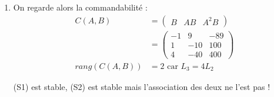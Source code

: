 \documentclass[../main.tex]{subfiles}
\begin{document}
\begin{enumerate}
\begin{enumerate}
\item On regarde alors la commandabilité :
\begin{align*}
C(A,B) &= \begin{pmatrix} B & AB & A^2B \end{pmatrix}\\
&= \begin{pmatrix}
-1 & 9 & -89 \\
1 & -10 & 100\\
4 & -40 & 400
\end{pmatrix}\\
rang(C(A,B)) &= 2 \text{	car	} L_3 = 4L_2
\end{align*}

(S1) est stable, (S2) est stable mais l'association des deux ne l'est pas !\\


\end{enumerate}
\end{enumerate}
\end{document}
